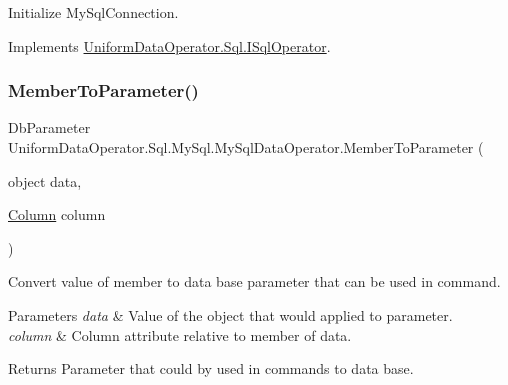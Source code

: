 Initialize My\+Sql\+Connection. 



Implements \mbox{\hyperlink{interface_uniform_data_operator_1_1_sql_1_1_i_sql_operator_a590fa080f8c35ebf5ee6ac535545e2a8}{Uniform\+Data\+Operator.\+Sql.\+I\+Sql\+Operator}}.

\mbox{\label{class_uniform_data_operator_1_1_sql_1_1_my_sql_1_1_my_sql_data_operator_a7d10fc1dfc16ece78ad066f596523782}} 
\subsubsection{\texorpdfstring{Member\+To\+Parameter()}{MemberToParameter()}}
{\footnotesize\ttfamily Db\+Parameter Uniform\+Data\+Operator.\+Sql.\+My\+Sql.\+My\+Sql\+Data\+Operator.\+Member\+To\+Parameter (\begin{DoxyParamCaption}\item[{object}]{data,  }\item[{\mbox{\hyperlink{class_uniform_data_operator_1_1_sql_1_1_tables_1_1_attributes_1_1_column}{Column}}}]{column }\end{DoxyParamCaption})}



Convert value of member to data base parameter that can be used in command. 


\begin{DoxyParams}{Parameters}
{\em data} & Value of the object that would applied to parameter.\\
\hline
{\em column} & Column attribute relative to member of data.\\
\hline
\end{DoxyParams}
\begin{DoxyReturn}{Returns}
Parameter that could by used in commands to data base.
\end{DoxyReturn}
\mbox{\label{class_uniform_data_operator_1_1_sql_1_1_my_sql_1_1_my_sql_data_operator_ae7ad4f4d29d927fa8551b087a6e596b5}} 
